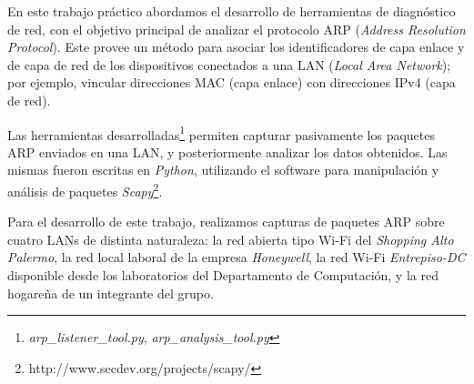 En este trabajo práctico abordamos el desarrollo de herramientas de diagnóstico de red, con el objetivo principal de analizar el protocolo ARP (\emph{Address Resolution Protocol}). Este provee un método para asociar los identificadores de capa enlace y de capa de red de los dispositivos conectados a una LAN (\emph{Local Area Network}); por ejemplo, vincular direcciones MAC (capa enlace) con direcciones IPv4 (capa de red).

Las herramientas desarrolladas\footnote{\emph{arp\_listener\_tool.py}, \emph{arp\_analysis\_tool.py}} permiten capturar pasivamente los paquetes ARP enviados en una LAN, y posteriormente analizar los datos obtenidos. Las mismas fueron escritas en \emph{Python}, utilizando el software para manipulación y análisis de paquetes \emph{Scapy}\footnote{http://www.secdev.org/projects/scapy/}.

Para el desarrollo de este trabajo, realizamos capturas de paquetes ARP sobre cuatro LANs de distinta naturaleza: la red abierta tipo Wi-Fi del \emph{Shopping Alto Palermo}, la red local laboral de la empresa \emph{Honeywell}, la red Wi-Fi \emph{Entrepiso-DC} disponible desde los laboratorios del Departamento de Computación, y la red hogareña de un integrante del grupo.